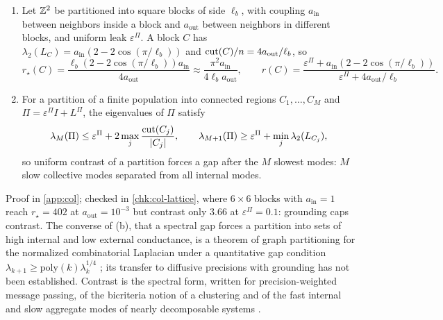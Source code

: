 \begin{proposition}\label{prop:col-block-media}
\begin{enumerate}
\item[(a)] Let $\mathbb{Z}^2$ be partitioned into square blocks of side $\ell_b$, with coupling $a_{\mathrm{in}}$ between neighbors inside a block and $a_{\mathrm{out}}$ between neighbors in different blocks, and uniform leak $\varepsilon^\Pi$. A block $C$ has $\lambda_2(L_C)=a_{\mathrm{in}}(2-2\cos(\pi/\ell_b))$ and $\operatorname{cut}(C)/n=4a_{\mathrm{out}}/\ell_b$, so
\[
r_\star(C)=\frac{\ell_b(2-2\cos(\pi/\ell_b))a_{\mathrm{in}}}{4a_{\mathrm{out}}}\approx\frac{\pi^2a_{\mathrm{in}}}{4\ell_ba_{\mathrm{out}}},\qquad r(C)=\frac{\varepsilon^\Pi+a_{\mathrm{in}}(2-2\cos(\pi/\ell_b))}{\varepsilon^\Pi+4a_{\mathrm{out}}/\ell_b}.
\]
\item[(b)] For a partition of a finite population into connected regions $C_1,\dots,C_M$ and $\Pi=\varepsilon^\Pi I+L^\Pi$, the eigenvalues of $\Pi$ satisfy
\begin{equation}\label{eq:col-gap}
\lambda_M(\Pi)\le\varepsilon^\Pi+2\max_j\frac{\operatorname{cut}(C_j)}{|C_j|},\qquad\lambda_{M+1}(\Pi)\ge\varepsilon^\Pi+\min_j\lambda_2(L_{C_j}),
\end{equation}
so uniform contrast of a partition forces a gap after the $M$ slowest modes: $M$ slow collective modes separated from all internal modes.
\end{enumerate}
\end{proposition}
Proof in \cref{app:col}; checked in \cref{chk:col-lattice}, where $6\times6$ blocks with $a_{\mathrm{in}}=1$ reach $r_\star=402$ at $a_{\mathrm{out}}=10^{-3}$ but contrast only $3.66$ at $\varepsilon^\Pi=0.1$: grounding caps contrast. The converse of (b), that a spectral gap forces a partition into sets of high internal and low external conductance, is a theorem of graph partitioning for the normalized combinatorial Laplacian under a quantitative gap condition $\lambda_{k+1}\ge\mathrm{poly}(k)\lambda_k^{1/4}$ \citep{oveisgharan2014partitioning}; its transfer to diffusive precisions with grounding has not been established. Contrast is the spectral form, written for precision-weighted message passing, of the bicriteria notion of a clustering \citep{kannan2004clusterings} and of the fast internal and slow aggregate modes of nearly decomposable systems \citep{simon1961aggregation}.

